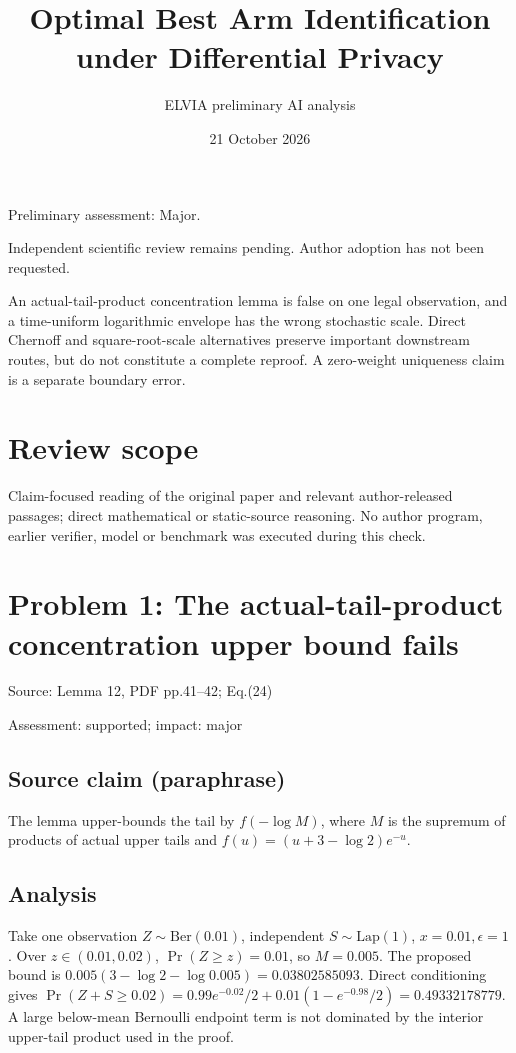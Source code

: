 \documentclass[11pt]{article}
\begin{document}
\title{Optimal Best Arm Identification under Differential Privacy}

\author{ELVIA preliminary AI analysis}\date{21 October 2026}\maketitle

Preliminary assessment: Major.\par

Independent scientific review remains pending. Author adoption has not been requested.

An actual-tail-product concentration lemma is false on one legal observation, and a time-uniform logarithmic envelope has the wrong stochastic scale. Direct Chernoff and square-root-scale alternatives preserve important downstream routes, but do not constitute a complete reproof. A zero-weight uniqueness claim is a separate boundary error.

\section*{Review scope}

Claim-focused reading of the original paper and relevant author-released passages; direct mathematical or static-source reasoning. No author program, earlier verifier, model or benchmark was executed during this check.

\section*{Problem 1: The actual-tail-product concentration upper bound fails}

Source: Lemma 12, PDF pp.41–42; Eq.(24)

Assessment: supported; impact: major

\subsection*{Source claim (paraphrase)}

The lemma upper-bounds the tail by \(f(-\log M)\), where \(M\) is the supremum of products of actual upper tails and \(f(u)=(u+3-\log2)e^{-u}\).

\subsection*{Analysis}

Take one observation \(Z\sim\mathrm{Ber}(0.01)\), independent \(S\sim\mathrm{Lap}(1)\), \(x=0.01,\epsilon=1\). Over \(z\in(0.01,0.02)\), \(\Pr(Z\ge z)=0.01\), so \(M=0.005\). The proposed bound is \(0.005(3-\log2-\log0.005)=0.03802585093\). Direct conditioning gives \(\Pr(Z+S\ge0.02)=0.99e^{-0.02}/2+0.01(1-e^{-0.98}/2)=0.49332178779\). A large below-mean Bernoulli endpoint term is not dominated by the interior upper-tail product used in the proof.
\end{document}
